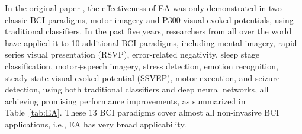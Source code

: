 \documentclass[journal]{IEEEtran}
\begin{document}
In the original paper \cite{drwuEA2020}, the effectiveness of EA was only demonstrated in two classic BCI paradigms, motor imagery and P300 visual evoked potentials, using traditional classifiers. In the past five years, researchers from all over the world have applied it to 10 additional BCI paradigms, including mental imagery, rapid series visual presentation (RSVP), error-related negativity, sleep stage classification, motor+speech imagery, stress detection, emotion recognition, steady-state visual evoked potential (SSVEP), motor execution, and seizure detection, using both traditional classifiers and deep neural networks, all achieving promising performance improvements, as summarized in Table~\ref{tab:EA}. These 13 BCI paradigms cover almost all non-invasive BCI applications, i.e., EA has very broad applicability.
\end{document}
